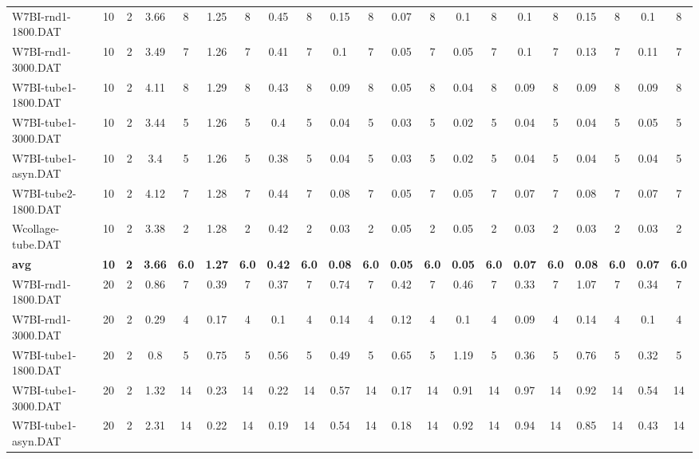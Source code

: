 \begin{sidewaystable}[!ht]
{\begin{tabular}{lcccccccccccccccccccc}
W7BI-rnd1-1800.DAT & 10 & 2 & 3.66 & 8 & 1.25 & 8 & 0.45 & 8 & 0.15 & 8 &  \textcolor{blue2}{0.07} & 8 & 0.1 & 8 & 0.1 & 8 & 0.15 & 8 & 0.1 & 8 \\
W7BI-rnd1-3000.DAT & 10 & 2 & 3.49 & 7 & 1.26 & 7 & 0.41 & 7 & 0.1 & 7 &  \textcolor{blue2}{0.05} & 7 &  \textcolor{blue2}{0.05} & 7 & 0.1 & 7 & 0.13 & 7 & 0.11 & 7 \\
W7BI-tube1-1800.DAT & 10 & 2 & 4.11 & 8 & 1.29 & 8 & 0.43 & 8 & 0.09 & 8 & 0.05 & 8 &  \textcolor{blue2}{0.04} & 8 & 0.09 & 8 & 0.09 & 8 & 0.09 & 8 \\
W7BI-tube1-3000.DAT & 10 & 2 & 3.44 & 5 & 1.26 & 5 & 0.4 & 5 & 0.04 & 5 & 0.03 & 5 &  \textcolor{blue2}{0.02} & 5 & 0.04 & 5 & 0.04 & 5 & 0.05 & 5 \\
W7BI-tube1-asyn.DAT & 10 & 2 & 3.4 & 5 & 1.26 & 5 & 0.38 & 5 & 0.04 & 5 & 0.03 & 5 &  \textcolor{blue2}{0.02} & 5 & 0.04 & 5 & 0.04 & 5 & 0.04 & 5 \\
W7BI-tube2-1800.DAT & 10 & 2 & 4.12 & 7 & 1.28 & 7 & 0.44 & 7 & 0.08 & 7 &  \textcolor{blue2}{0.05} & 7 &  \textcolor{blue2}{0.05} & 7 & 0.07 & 7 & 0.08 & 7 & 0.07 & 7 \\
Wcollage-tube.DAT & 10 & 2 & 3.38 & 2 & 1.28 & 2 & 0.42 & 2 &  \textcolor{blue2}{0.03} & 2 & 0.05 & 2 & 0.05 & 2 &  \textcolor{blue2}{0.03} & 2 &  \textcolor{blue2}{0.03} & 2 &  \textcolor{blue2}{0.03} & 2 \\
\cline{1-21} \textbf{avg} & \textbf{10} & \textbf{2} & \textbf{3.66} & \textbf{6.0} & \textbf{1.27} & \textbf{6.0} & \textbf{0.42} & \textbf{6.0} & \textbf{0.08} & \textbf{6.0} & \textbf{0.05} & \textbf{6.0} & \textbf{0.05} & \textbf{6.0} & \textbf{0.07} & \textbf{6.0} & \textbf{0.08} & \textbf{6.0} & \textbf{0.07} & \textbf{6.0} \\ \cline{1-21}
W7BI-rnd1-1800.DAT & 20 & 2 & 0.86 & 7 & 0.39 & 7 & 0.37 & 7 & 0.74 & 7 & 0.42 & 7 & 0.46 & 7 &  \textcolor{blue2}{0.33} & 7 & 1.07 & 7 & 0.34 & 7 \\
W7BI-rnd1-3000.DAT & 20 & 2 & 0.29 & 4 & 0.17 & 4 & 0.1 & 4 & 0.14 & 4 & 0.12 & 4 & 0.1 & 4 &  \textcolor{blue2}{0.09} & 4 & 0.14 & 4 & 0.1 & 4 \\
W7BI-tube1-1800.DAT & 20 & 2 & 0.8 & 5 & 0.75 & 5 & 0.56 & 5 & 0.49 & 5 & 0.65 & 5 & 1.19 & 5 & 0.36 & 5 & 0.76 & 5 &  \textcolor{blue2}{0.32} & 5 \\
W7BI-tube1-3000.DAT & 20 & 2 & 1.32 & 14 & 0.23 & 14 & 0.22 & 14 & 0.57 & 14 &  \textcolor{blue2}{0.17} & 14 & 0.91 & 14 & 0.97 & 14 & 0.92 & 14 & 0.54 & 14 \\
W7BI-tube1-asyn.DAT & 20 & 2 & 2.31 & 14 & 0.22 & 14 & 0.19 & 14 & 0.54 & 14 &  \textcolor{blue2}{0.18} & 14 & 0.92 & 14 & 0.94 & 14 & 0.85 & 14 & 0.43 & 14 \\

\end{tabular}}
\end{sidewaystable}
